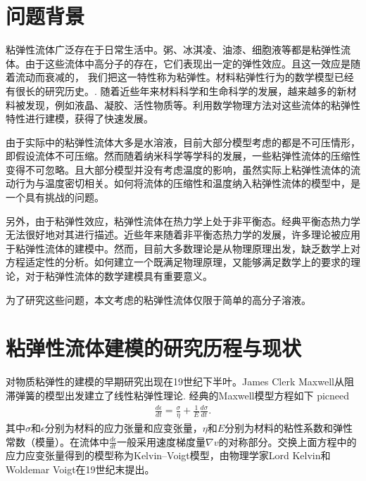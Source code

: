 \documentclass{article}
\begin{document}
\section{问题背景}
粘弹性流体广泛存在于日常生活中。粥、冰淇凌、油漆、细胞液等都是粘弹性流体。由于这些流体中高分子的存在，它们表现出一定的弹性效应。且这一效应是随着流动而衰减的\cite{}， 我们把这一特性称为粘弹性。材料粘弹性行为的数学模型已经有很长的研究历史。\cite{}. 随着近些年来材料科学和生命科学的发展，越来越多的新材料被发现，例如液晶、凝胶、活性物质等\cite{}。利用数学物理方法对这些流体的粘弹性特性进行建模，获得了快速发展\cite{}。

由于实际中的粘弹性流体大多是水溶液，目前大部分模型考虑的都是不可压情形，即假设流体不可压缩。然而随着纳米科学等学科的发展，一些粘弹性流体的压缩性变得不可忽略\cite{}。且大部分模型并没有考虑温度的影响，虽然实际上粘弹性流体的流动行为与温度密切相关。如何将流体的压缩性和温度纳入粘弹性流体的模型中，是一个具有挑战的问题\cite{}。

另外，由于粘弹性效应，粘弹性流体在热力学上处于非平衡态。经典平衡态热力学无法很好地对其进行描述。近些年来随着非平衡态热力学的发展，许多理论被应用于粘弹性流体的建模中\cite{}。然而，目前大多数理论是从物理原理出发，缺乏数学上对方程适定性的分析。如何建立一个既满足物理原理，又能够满足数学上的要求的理论，对于粘弹性流体的数学建模具有重要意义\cite{}。

为了研究这些问题，本文考虑的粘弹性流体仅限于简单的高分子溶液。

\section{粘弹性流体建模的研究历程与现状}
对物质粘弹性的建模的早期研究出现在19世纪下半叶。James Clerk Maxwell从阻滞弹簧的模型出发建立了线性粘弹性理论\cite{}. 经典的Maxwell模型方程如下
picneed
\begin{eqnarray*}
\frac {d\epsilon} {dt} = \frac {\sigma} {\eta} + \frac {1} {E} \frac {d\sigma} {dt}.
\end{eqnarray*}
其中$\sigma$和$\epsilon$分别为材料的应力张量和应变张量，$\eta$和$E$分别为材料的粘性系数和弹性常数（模量）。在流体中$\frac {d\epsilon} {dt}$一般采用速度梯度量$\nabla v$的对称部分。交换上面方程中的应力应变张量得到的模型称为Kelvin–Voigt模型，由物理学家Lord Kelvin和Woldemar Voigt在19世纪末提出\cite{}。
\end{document}
